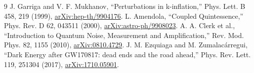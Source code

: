 \documentclass[11pt]{article}
\begin{document}
\begin{thebibliography}{9}
 J. Garriga and V. F. Mukhanov,
``Perturbations in k-inflation,'' Phys. Lett. B 458, 219 (1999),
\href{https://arxiv.org/abs/hep-th/9904176}{arXiv:hep-th/9904176}.
 L. Amendola, ``Coupled Quintessence,''
Phys. Rev. D 62, 043511 (2000),
\href{https://arxiv.org/abs/astro-ph/9908023}{arXiv:astro-ph/9908023}.
 A. A. Clerk et al., ``Introduction to Quantum Noise,
Measurement and Amplification,'' Rev. Mod. Phys. 82, 1155 (2010),
\href{https://arxiv.org/abs/0810.4729}{arXiv:0810.4729}.
 J. M. Ezquiaga and M. Zumalac\'arregui,
``Dark Energy after GW170817: dead ends and the road ahead,''
Phys. Rev. Lett. 119, 251304 (2017),
\href{https://arxiv.org/abs/1710.05901}{arXiv:1710.05901}.
\end{thebibliography}
\end{document}
